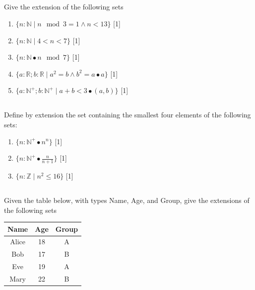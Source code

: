 \documentclass[twocolumn]{article}
\newcounter{pmarks}
\newcounter{marks}
\newcommand\mrk[1]{{\hfill\color{blue}\small[{#1}]}\addtocounter{pmarks}{#1}\addtocounter{marks}{#1}}
\begin{document}
\subsection{}

    Give the extension of the following sets

    \begin{enumerate}
        \item $\{ n : \mathbb{N} \mid n \mod 3 = 1 \wedge n < 13 \} $ \mrk{1}
        \item $\{ n : \mathbb{N} \mid 4 < n < 7 \} $ \mrk{1}
        \item $ \{ n : \mathbb{N} \bullet n \mod 7 \} $ \mrk{1}
        \item $\{ a : \mathbb{R}; b : \mathbb{R}  \mid a^2 = b \wedge b^2 = a \bullet a \} $ \mrk{1}
        \item $\{ a : \mathbb{N}^+; b : \mathbb{N}^+  \mid a + b < 3 \bullet (a, b) \} $ \mrk{1}
    \end{enumerate}


\subsection{}

    Define by extension the set containing the smallest four elements of the following sets:

    \begin{enumerate}
        \item $ \{ n : \mathbb{N}^+ \bullet n^n \} $ \mrk{1}
        \item $ \{ n : \mathbb{N}^+ \bullet \frac{n}{n+1} \} $ \mrk{1}
        \item $ \{ n : \mathbb{Z} \mid n^2 \leq 16  \} $ \mrk{1}
    \end{enumerate}

\subsection{}

    Given the table below, with types Name, Age, and Group, give the extensions of the following sets

    \begin{table}[h!]
        \centering
        \begin{tabular}{c | c | c }
            \toprule
            Name & Age & Group \\
            \midrule
            Alice & 18 & A  \\
            Bob & 17 & B  \\
            Eve & 19 & A \\
            Mary & 22 & B \\
            \bottomrule
        \end{tabular}
    \end{table}
\end{document}
